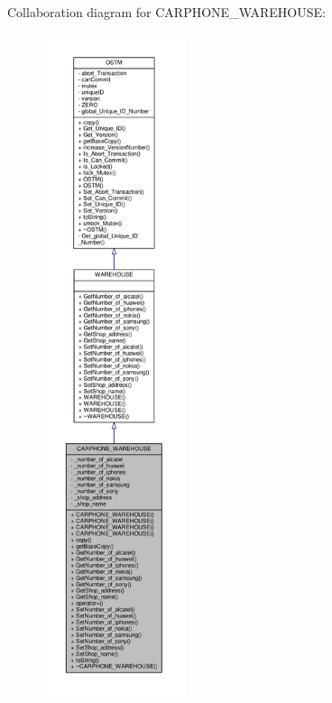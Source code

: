 Collaboration diagram for C\+A\+R\+P\+H\+O\+N\+E\+\_\+\+W\+A\+R\+E\+H\+O\+U\+SE\+:\nopagebreak
\begin{figure}[H]
\begin{center}
\leavevmode
\includegraphics[height=550pt]{class_c_a_r_p_h_o_n_e___w_a_r_e_h_o_u_s_e__coll__graph}
\end{center}
\end{figure}
